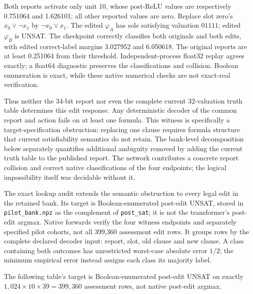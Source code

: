 \documentclass[
  british,
  11pt,
  a4paper,
]{article}
\begin{document}
Both reports activate only unit 10, whose post-ReLU values are
respectively 0.751064 and 1.626101; all other reported values are zero.
Replace slot zero's \(x_0\lor\neg x_1\) by \(\neg x_0\lor x_1\). The
edited \(\varphi_A\) has sole satisfying valuation \(01111\); edited
\(\varphi_B\) is UNSAT. The checkpoint correctly classifies both
originals and both edits, with edited correct-label margins 3.027952 and
6.050618. The original reports are at least 0.251064 from their
threshold. Independent-process float32 replay agrees exactly; a float64
diagnostic preserves the classifications and collision. Boolean
enumeration is exact, while these native numerical checks are not
exact-real verification.

Thus neither the 34-bit report nor even the complete current
32-valuation truth table determines this edit response. Any
deterministic decoder of the common report and action fails on at least
one formula. This witness is specifically a target-specification
obstruction: replacing one clause requires formula structure that
current satisfiability semantics do not retain. The bank-level
decomposition below separately quantifies additional ambiguity removed
by adding the current truth table to the published report. The network
contributes a concrete report collision and correct native
classifications of the four endpoints; the logical impossibility itself
was decidable without it.

The exact lookup audit extends the semantic obstruction to every legal
edit in the retained bank. Its target is Boolean-enumerated post-edit
UNSAT, stored in \texttt{pilot\_bank.npz} as the complement of
\texttt{post\_sat}; it is not the transformer's post-edit argmax. Native
forwards verify the four witness endpoints and separately specified
pilot cohorts, not all 399,360 assessment edit rows. It groups rows by
the complete declared decoder input: report, slot, old clause and new
clause. A class containing both outcomes has unrestricted worst-case
absolute error \(1/2\); the minimum empirical error instead assigns each
class its majority label.

The following table's target is Boolean-enumerated post-edit UNSAT on
exactly \(1,024\times10\times39=399,360\) assessment rows, not native
post-edit argmax.
\end{document}
